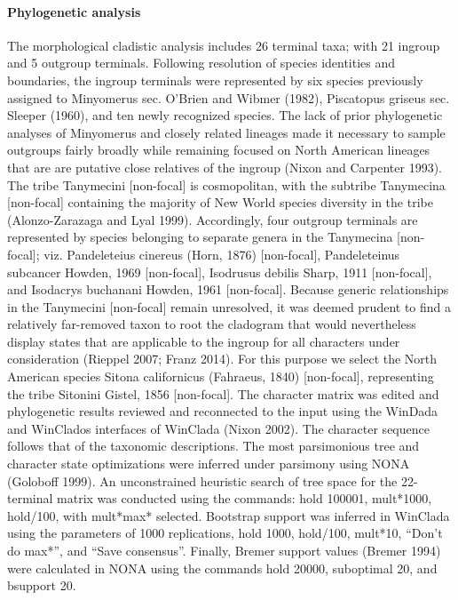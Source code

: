 \documentclass[fleqn,10pt,lineno]{wlpeerj} %
\begin{document}
	\paragraph{Phylogenetic analysis}
		The morphological cladistic analysis includes 26 terminal taxa; with 21 ingroup and 5 outgroup terminals.
		Following resolution of species identities and boundaries, the ingroup terminals were represented by six species previously assigned to Minyomerus sec. O’Brien and Wibmer (1982), Piscatopus griseus sec. Sleeper (1960), and ten newly recognized species.
		The lack of prior phylogenetic analyses of Minyomerus and closely related lineages made it necessary to sample outgroups fairly broadly while remaining focused on North American lineages that are are putative close relatives of the ingroup (Nixon and Carpenter 1993).
		The tribe Tanymecini [non-focal] is cosmopolitan, with the subtribe Tanymecina [non-focal] containing the majority of New World species diversity in the tribe (Alonzo-Zarazaga and Lyal 1999).
		Accordingly, four outgroup terminals are represented by species belonging to separate genera in the Tanymecina [non-focal]; viz. Pandeleteius cinereus (Horn, 1876) [non-focal], Pandeleteinus subcancer Howden, 1969 [non-focal], Isodrusus debilis Sharp, 1911 [non-focal], and Isodacrys buchanani Howden, 1961 [non-focal].
		Because generic relationships in the Tanymecini [non-focal] remain unresolved, it was deemed prudent to find a relatively far-removed taxon to root the cladogram that would nevertheless display states that are applicable to the ingroup for all characters under consideration (Rieppel 2007; Franz 2014).
		For this purpose we select the North American species Sitona californicus (Fahraeus, 1840) [non-focal], representing the tribe Sitonini Gistel, 1856 [non-focal].
		The character matrix was edited and phylogenetic results reviewed and reconnected to the input using the WinDada and WinClados interfaces of WinClada (Nixon 2002).
		The character sequence follows that of the taxonomic descriptions.
		The most parsimonious tree and character state optimizations were inferred under parsimony using NONA (Goloboff 1999).
		An unconstrained heuristic search of tree space for the 22-terminal matrix was conducted using the commands: hold 100001, mult*1000, hold/100, with mult*max* selected.
		Bootstrap support was inferred in WinClada using the parameters of 1000 replications, hold 1000, hold/100, mult*10, “Don’t do max*”, and “Save consensus”.
		Finally, Bremer support values (Bremer 1994) were calculated in NONA using the commands hold 20000, suboptimal 20, and bsupport 20.
\end{document}
